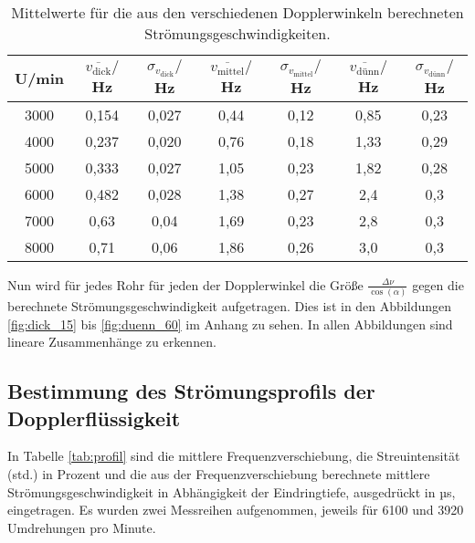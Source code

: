 \begin{table}[h!]
	\begin{center}
    \caption{Mittelwerte für die aus den verschiedenen Dopplerwinkeln berechneten
    Strömungsgeschwindigkeiten.}
    \label{tab:mittelwerte}
		\begin{tabular}{ccccccc}
		\toprule
			{U/min} & {$\overline{v_{{\text{dick}}}}/$Hz} & {$\sigma_{{v_{\text{dick}}}}/$Hz} &
      {$\overline{v_{\text{mittel}}}/$Hz} & {$\sigma_{{v_{\text{mittel}}}}/$Hz} &
      {$\overline{v_{\text{dünn}}}/$Hz} & {$\sigma_{{v_{\text{dünn}}}}/$Hz}\\
			\midrule
			3000 & 0,154 & 0,027 & 0,44 & 0,12 & 0,85 & 0,23\\
			4000 & 0,237 & 0,020 & 0,76 & 0,18 & 1,33 & 0,29\\
			5000 & 0,333 & 0,027 & 1,05 & 0,23 & 1,82 & 0,28\\
			6000 & 0,482 & 0,028 & 1,38 & 0,27 & 2,4 & 0,3\\
			7000 & 0,63  & 0,04 & 1,69 & 0,23 & 2,8 & 0,3\\
			8000 & 0,71  & 0,06 & 1,86 & 0,26 & 3,0 & 0,3\\
		\bottomrule
		\end{tabular}
	\end{center}
\end{table}

Nun wird für jedes Rohr für jeden der Dopplerwinkel die Größe $\frac{\Delta \nu}{\cos(\alpha)}$
gegen die berechnete Strömungsgeschwindigkeit aufgetragen. Dies ist in den Abbildungen
\ref{fig:dick_15} bis \ref{fig:duenn_60} im Anhang zu sehen. In allen Abbildungen sind
lineare Zusammenhänge zu erkennen.

\newpage
\subsection{Bestimmung des Strömungsprofils der Dopplerflüssigkeit}
\label{subsec:strömungsprofil}

In Tabelle \ref{tab:profil} sind die mittlere Frequenzverschiebung,
die Streuintensität (std.) in Prozent und die aus der Frequenzverschiebung
berechnete mittlere Strömungsgeschwindigkeit in Abhängigkeit der Eindringtiefe,
ausgedrückt in µs, eingetragen. Es wurden zwei Messreihen aufgenommen, jeweils für
6100 und 3920 Umdrehungen pro Minute.

